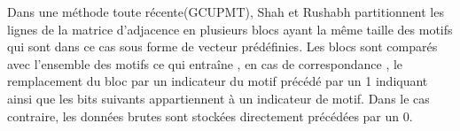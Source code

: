 
			Dans une méthode toute récente(GCUPMT), Shah et Rushabh \citep{shah2018graph}  partitionnent les lignes de la matrice d'adjacence en plusieurs blocs ayant la même taille des motifs qui sont dans ce cas sous forme de vecteur prédéfinies. Les blocs sont comparés avec l'ensemble des motifs ce qui entraîne , en cas de correspondance , le remplacement du bloc par un indicateur du motif précédé par un 1 indiquant ainsi que les bits suivants appartiennent à un indicateur de motif. Dans le cas contraire, les données brutes sont stockées directement précédées par un 0.
				